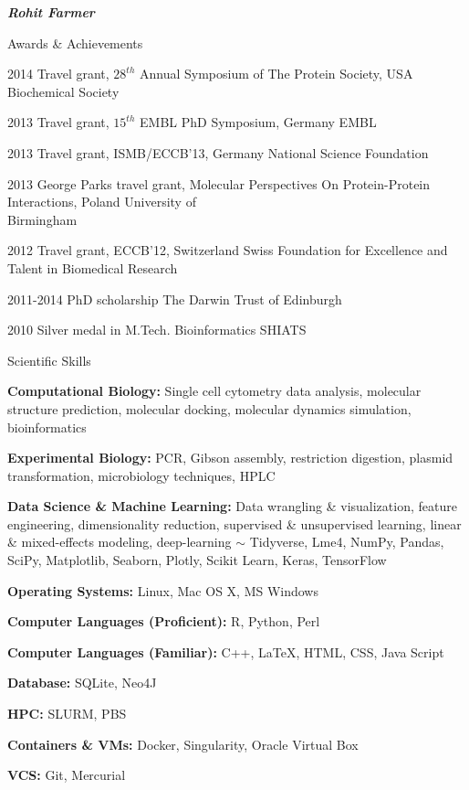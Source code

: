 \documentclass[10pt]{article}
\begin{document}
\begin{cv}{\huge \it \bfseries Rohit Farmer}
\begin{cvlist}{Awards \& Achievements}
	\item[2014] Travel grant, $28^{th}$ Annual Symposium of The Protein Society, USA \hfill Biochemical Society
	\item[2013] Travel grant, $15^{th}$ EMBL PhD Symposium, Germany \hfill EMBL
	\item[2013] Travel grant, ISMB/ECCB'13, Germany \hfill National Science Foundation
	\item[2013] George Parks travel grant,  Molecular Perspectives On Protein-Protein Interactions, Poland \hfill University of \\ \hspace*{\fill} Birmingham
	\item[2012] Travel grant, ECCB'12, Switzerland \hfill Swiss Foundation for Excellence and \\ \hspace*{\fill} Talent in Biomedical Research
	\item[2011-2014] PhD scholarship \hfill The Darwin Trust of Edinburgh
	\item[2010] Silver medal in M.Tech. Bioinformatics \hfill SHIATS
\end{cvlist}

\vskip3pt
\begin{cvlist}{Scientific Skills}
	\item[\textbf{Computational Biology:}] Single cell cytometry data analysis, molecular structure prediction, molecular docking, molecular dynamics simulation, bioinformatics
	\item[\textbf{Experimental Biology:}] PCR, Gibson assembly, restriction digestion, plasmid transformation, microbiology techniques, HPLC
        \item[\textbf{Data Science \& Machine Learning:}] Data wrangling \& visualization, feature engineering, dimensionality reduction, supervised \& unsupervised learning, linear \& mixed-effects modeling, deep-learning $ \sim $ Tidyverse, Lme4, NumPy, Pandas, SciPy, Matplotlib, Seaborn, Plotly, Scikit Learn, Keras, TensorFlow
	\item[\textbf{Operating Systems:}] Linux, Mac OS X, MS Windows
	\item[\textbf{Computer Languages (Proficient):}] R, Python, Perl
	\item[\textbf{Computer Languages (Familiar):}] C++, \LaTeX, HTML, CSS, Java Script
	\item[\textbf{Database:}] SQLite, Neo4J
	\item[\textbf{HPC:}] SLURM, PBS
	\item[\textbf{Containers \& VMs:}] Docker, Singularity, Oracle Virtual Box
	\item[\textbf{VCS:}] Git, Mercurial
\end{cvlist}


\end{cv}
\end{document}

